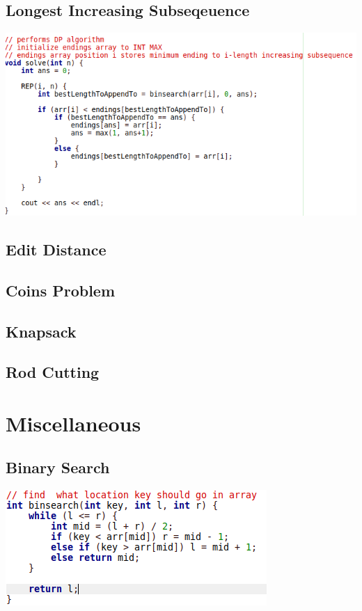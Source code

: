 \documentclass[11pt,twocolumn]{article}
\begin{document}
\subsection{Longest Increasing Subseqeuence}

\includegraphics[scale=0.5]{lis}

\subsection{Edit Distance}
\subsection{Coins Problem}
\subsection{Knapsack}
\subsection{Rod Cutting}


\section{Miscellaneous}
\subsection{Binary Search}

\includegraphics[scale=0.5]{binsearch}
\end{document}

